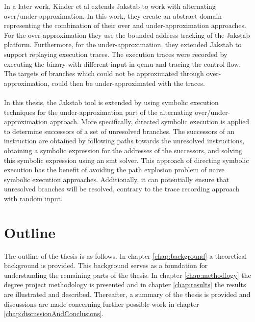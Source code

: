 \documentclass{kththesis}
\begin{document}
In a later work, Kinder et al extends Jakstab to work with alternating over/under-approximation\cite{alternating}. In this work, they create an abstract domain representing the combination of their over and under-approximation approaches. For the over-approximation they use the bounded address tracking of the Jakstab platform. Furthermore, for the under-approximation, they extended Jakstab to support replaying execution traces. The execution traces were recorded by executing the binary with different input in qemu and tracing the control flow. The targets of branches which could not be approximated through over-approximation, could then be under-approximated with the traces. 
\\ \\
In this thesis, the Jakstab tool is extended by using symbolic execution techniques for the under-approximation part of the alternating over/under-approximation approach. More specifically, directed symbolic execution is applied to determine successors of a set of unresolved branches. The successors of an instruction are obtained by following paths towards the unresolved instructions, obtaining a symbolic expression for the addresses of the successors, and solving this symbolic expression using an smt solver. This approach of directing symbolic execution has the benefit of avoiding the path explosion problem of naive symbolic execution approaches. Additionally, it can potentially ensure that unresolved branches will be resolved, contrary to the trace recording approach with random input.

\section{Outline}
The outline of the thesis is as follows. In chapter \ref{chap:background} a theoretical background is provided. This background serves as a foundation for understanding the remaining parts of the thesis. In chapter \ref{chap:methodlogy} the degree project methodology is presented and in chapter \ref{chap:results} the results are illustrated and described. Thereafter, a summary of the thesis is provided and discussions are made concerning further possible work in chapter \ref{chap:discussionAndConclusions}.
 
\end{document}
